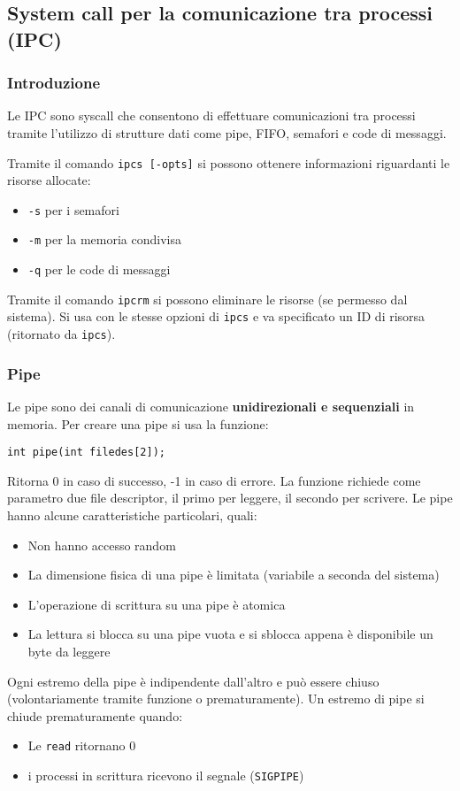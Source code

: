 \documentclass[a4paper]{article}
\begin{document}
\subsection{System call per la comunicazione tra processi (IPC)}
\subsubsection{Introduzione}
Le IPC sono syscall che consentono di effettuare comunicazioni tra processi tramite l'utilizzo di strutture dati come pipe, FIFO, semafori e code di messaggi.

Tramite il comando \verb|ipcs [-opts]| si possono ottenere informazioni riguardanti le risorse allocate:
\begin{itemize}
\item \verb|-s| per i semafori
\item \verb|-m| per la memoria condivisa
\item \verb|-q| per le code di messaggi
\end{itemize}

Tramite il comando \verb|ipcrm| si possono eliminare le risorse (se permesso dal sistema). Si usa con le stesse opzioni di \verb|ipcs| e va specificato un ID di risorsa (ritornato da \verb|ipcs|).

\subsubsection{Pipe}
Le pipe sono dei canali di comunicazione \textbf{unidirezionali e sequenziali} in memoria. Per creare una pipe si usa la funzione:
\begin{verbatim}
int pipe(int filedes[2]);
\end{verbatim}
Ritorna 0 in caso di successo, -1 in caso di errore. La funzione richiede come parametro due file descriptor, il primo per leggere, il secondo per scrivere.
Le pipe hanno alcune caratteristiche particolari, quali:
\begin{itemize}
\item Non hanno accesso random
\item La dimensione fisica di una pipe è limitata (variabile a seconda del sistema)
\item L'operazione di scrittura su una pipe è atomica
\item La lettura si blocca su una pipe vuota e si sblocca appena è disponibile un byte da leggere
\end{itemize}
Ogni estremo della pipe è indipendente dall'altro e può essere chiuso (volontariamente tramite funzione o prematuramente).
Un estremo di pipe si chiude prematuramente quando:
\begin{itemize}
\item Le \verb|read| ritornano 0
\item i processi in scrittura ricevono il segnale (\verb|SIGPIPE|)
\end{itemize}
\end{document}
